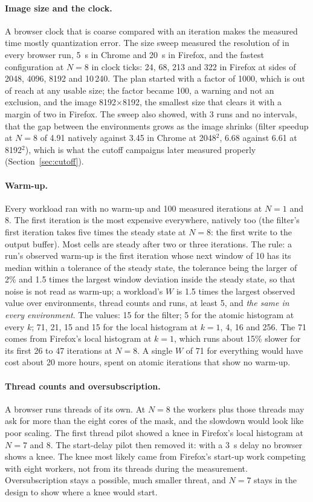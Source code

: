 \paragraph{Image size and the clock.} A browser clock that is coarse
compared with an iteration makes the measured time mostly quantization
error. The size sweep measured the resolution of 
in every browser run, 5~\textmu s in Chrome and 20~\textmu s in Firefox, and
the fastest configuration at $N=8$ in clock ticks: 24, 68, 213 and 322 in
Firefox at sides of 2048, 4096, 8192 and 10\,240. The plan started with a
factor of 1000, which is out of reach at any usable size; the factor became
100, a warning and not an exclusion, and the image 8192$\times$8192, the
smallest size that clears it with a margin of two in Firefox. The sweep
also showed, with 3 runs and no intervals, that the gap between the
environments grows as the image shrinks (filter speedup at $N=8$ of 4.91
natively against 3.45 in Chrome at 2048$^2$, 6.68 against 6.61 at
8192$^2$), which is what the cutoff campaigns later measured properly
(Section~\ref{sec:cutoff}).

\paragraph{Warm-up.} Every workload ran with no warm-up and 100 measured
iterations at $N=1$ and 8. The first iteration is the most expensive
everywhere, natively too (the filter's first iteration takes five times the
steady state at $N=8$: the first write to the output buffer). Most cells
are steady after two or three iterations. The rule: a run's observed
warm-up is the first iteration whose next window of 10 has its median
within a tolerance of the steady state, the tolerance being the larger of
2\% and 1.5 times the largest window deviation inside the steady state, so
that noise is not read as warm-up; a workload's $W$ is 1.5 times the
largest observed value over environments, thread counts and runs, at least
5, and \emph{the same in every environment}. The values: 15 for the filter;
5 for the atomic histogram at every $k$; 71, 21, 15 and 15 for the local
histogram at $k=1$, 4, 16 and 256. The 71 comes from Firefox's local
histogram at $k=1$, which runs about 15\% slower for its first 26 to 47
iterations at $N=8$. A single $W$ of 71 for everything would have cost
about 20 more hours, spent on atomic iterations that show no warm-up.

\paragraph{Thread counts and oversubscription.} A browser runs threads of
its own. At $N=8$ the workers plus those threads may ask for more than the
eight cores of the mask, and the slowdown would look like poor scaling. The
first thread pilot showed a knee in Firefox's local histogram at $N=7$ and
8. The start-delay pilot then removed it: with a 3~s delay no browser shows
a knee. The knee most likely came from Firefox's start-up work competing
with eight workers, not from its threads during the measurement.
Oversubscription stays a possible, much smaller threat, and $N=7$ stays in
the design to show where a knee would start.

